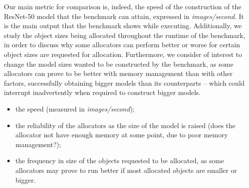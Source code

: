 \documentclass[12pt,twoside]{article}
\begin{document}
Our main metric for comparison is, indeed, the speed of the construction of the ResNet-50 model that the benchmark can attain, expressed in \textit{images/second}. It is the main output that the benchmark shows while executing. Additionally, we study the object sizes being allocated throughout the runtime of the benchmark, in order to discuss why some allocators can perform better or worse for certain object sizes are requested for allocation. Furthermore, we consider of interest to change the model sizes wanted to be constructed by the benchmark, as some allocators can prove to be better with memory management than with other factors, successfully obtaining bigger models than its counterparts -- which could interrupt inadvertently when required to construct bigger models.






\begin{itemize}
\vspace{-10px}
\itemsep-0.25em 
\item the speed (measured in \textit{images/second});
\item the reliability of the allocators as the size of the model is raised (does the allocator not have enough memory at some point, due to poor memory management?);
\item the frequency in size of the objects requested to be allocated, as some allocators may prove to run better if most allocated objects are smaller or bigger.
\vspace{-10px}
\end{itemize}
\end{document}
